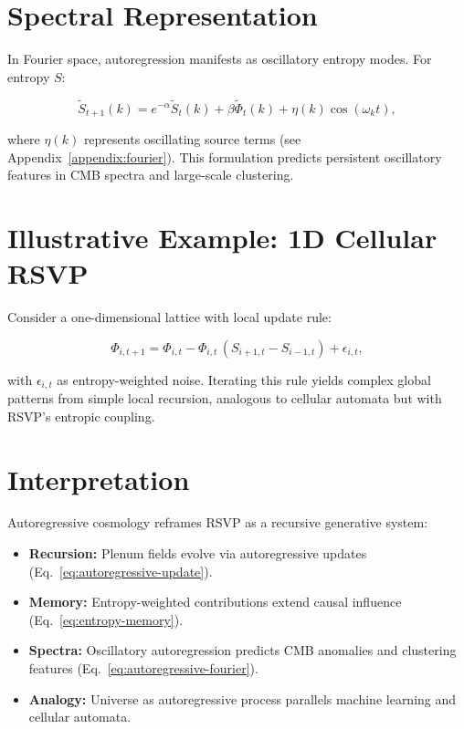 \documentclass[12pt]{report}
\begin{document}
\section{Spectral Representation}

In Fourier space, autoregression manifests as oscillatory entropy modes. For entropy $S$:

\begin{equation}
\tilde{S}_{t+1}(k) = e^{-\alpha} \tilde{S}_t(k) + \beta \tilde{\Phi}_t(k) + \eta(k) \cos(\omega_k t),
\label{eq:autoregressive-fourier}
\end{equation}

where $\eta(k)$ represents oscillating source terms (see Appendix~\ref{appendix:fourier}). This formulation predicts persistent oscillatory features in CMB spectra and large-scale clustering.

\section{Illustrative Example: 1D Cellular RSVP}

Consider a one-dimensional lattice with local update rule:

\begin{equation}
\Phi_{i,t+1} = \Phi_{i,t} - \Phi_{i,t} \, (S_{i+1,t} - S_{i-1,t}) + \epsilon_{i,t},
\end{equation}

with $\epsilon_{i,t}$ as entropy-weighted noise. Iterating this rule yields complex global patterns from simple local recursion, analogous to cellular automata but with RSVP’s entropic coupling.

\section{Interpretation}

Autoregressive cosmology reframes RSVP as a recursive generative system:

\begin{itemize}
    \item \textbf{Recursion:} Plenum fields evolve via autoregressive updates (Eq.~\ref{eq:autoregressive-update}).  
    \item \textbf{Memory:} Entropy-weighted contributions extend causal influence (Eq.~\ref{eq:entropy-memory}).  
    \item \textbf{Spectra:} Oscillatory autoregression predicts CMB anomalies and clustering features (Eq.~\ref{eq:autoregressive-fourier}).  
    \item \textbf{Analogy:} Universe as autoregressive process parallels machine learning and cellular automata.  
\end{itemize}
\end{document}
